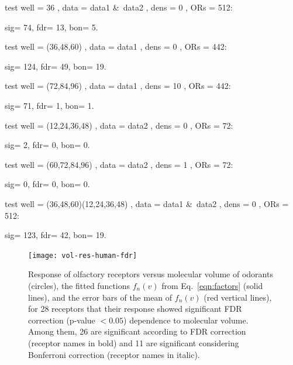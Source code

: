 \documentclass[11pt]{paper} %
\newcommand{\numberofreceptors}{ 28 }
\newcommand{\bonferroni}{ 11 }
\newcommand{\fdr}{ 26 }
\begin{document}
test well = 36 , data = data1 \&\ data2 , dens = 0 , ORs = 512:

sig= 74, fdr= 13, bon= 5.

test well = (36,48,60) , data = data1 , dens = 0 , ORs = 442:

sig= 124, fdr= 49, bon= 19.

test well = (72,84,96) , data = data1 , dens = 10 , ORs = 442:

sig= 71, fdr= 1, bon= 1.

test well = (12,24,36,48) , data = data2 , dens = 0 , ORs = 72:

sig= 2, fdr= 0, bon= 0.

test well = (60,72,84,96) , data = data2 , dens = 1 , ORs = 72:

sig= 0, fdr= 0, bon= 0.

test well = (36,48,60)(12,24,36,48) , data = data1 \&\ data2 , dens = 0 , ORs = 512:

sig= 123, fdr= 42, bon= 19.



\begin{figure}
	\centering
		\texttt{[image: vol-res-human-fdr]}
		\label{fig:vol-res:all}		
	\caption{Response of olfactory receptors  versus molecular volume of odorants (circles),  
			the fitted functions $f_n(v)$ from Eq.~\ref{eqn:factors} (solid lines), 
			and the error bars of the mean of $f_n(v)$ (red vertical lines), 
			for \numberofreceptors receptors that their response showed significant FDR correction (p-value $<0.05$) dependence to molecular volume. 
			Among them, \fdr are significant according to FDR correction (receptor names in bold) and 
			\bonferroni are significant considering Bonferroni correction (receptor names in italic).
		}
	\label{fig:vol-res-human}
\end{figure}
\end{document}
